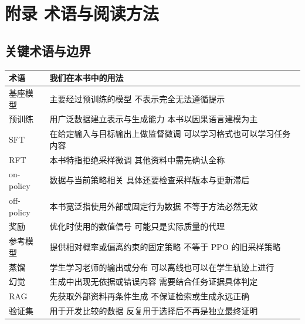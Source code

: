 \chapter*{附录 术语与阅读方法}\label{附录 术语与阅读方法}

\section*{关键术语与边界}\label{关键术语与边界}

\begin{longtable}[]{@{}
  >{\raggedright\arraybackslash}p{}
  >{\raggedright\arraybackslash}p{}@{}}
\toprule\noalign{}
\begin{minipage}[b]{\linewidth}\raggedright
\textbf{术语}
\end{minipage} & \begin{minipage}[b]{\linewidth}\raggedright
\textbf{我们在本书中的用法}
\end{minipage} \\
\midrule\noalign{}
\endhead
\bottomrule\noalign{}
\endlastfoot
基座模型 & 主要经过预训练的模型 不表示完全无法遵循提示 \\
预训练 & 用广泛数据建立表示与生成能力 本书以因果语言建模为主 \\
SFT & 在给定输入与目标输出上做监督微调 可以学习格式也可以学习任务内容 \\
RFT & 本书特指拒绝采样微调 其他资料中需先确认全称 \\
on-policy & 数据与当前策略相关 具体还要检查采样版本与更新滞后 \\
off-policy & 本书宽泛指使用外部或固定行为数据 不等于方法必然无效 \\
奖励 & 优化时使用的数值信号 可能只是实际质量的代理 \\
参考模型 & 提供相对概率或偏离约束的固定策略 不等于 PPO 的旧采样策略 \\
蒸馏 & 学生学习老师的输出或分布 可以离线也可以在学生轨迹上进行 \\
幻觉 & 生成中出现无依据或错误内容 需要结合任务证据具体判定 \\
RAG & 先获取外部资料再条件生成 不保证检索或生成永远正确 \\
验证集 & 用于开发比较的数据 反复用于选择后不再是独立最终证明 \\
\end{longtable}

